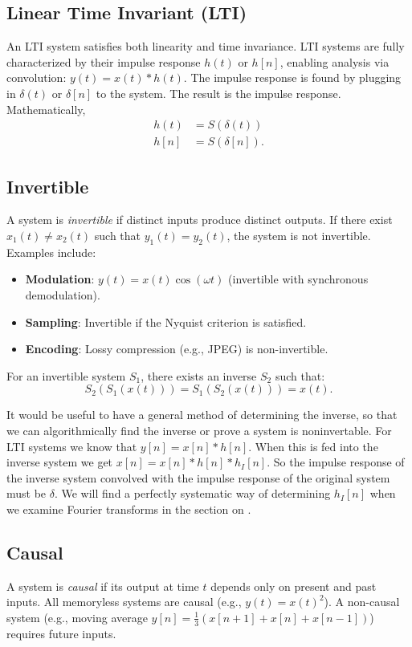 \subsection{Linear Time Invariant (LTI)}
An LTI system satisfies both linearity and time invariance.
LTI systems are fully characterized by their impulse response
\( h(t) \) or \( h[n] \), enabling analysis via convolution:
\( y(t) = x(t) * h(t) \). The impulse response is found by
plugging in $\delta(t)$ or $\delta[n]$ to the system. The result
is the impulse response. Mathematically,
\begin{align}
    h(t) & = S(\delta(t))  \\
    h[n] & = S(\delta[n]).
\end{align}


\subsection{Invertible}
A system is \emph{invertible} if distinct inputs produce distinct outputs. If there exist \( x_1(t) \neq x_2(t) \) such that \( y_1(t) = y_2(t) \), the system is not invertible. Examples include:
\begin{itemize}
    \item \textbf{Modulation}: \( y(t) = x(t)\cos(\omega t) \) (invertible with synchronous demodulation).
    \item \textbf{Sampling}: Invertible if the Nyquist criterion is satisfied.
    \item \textbf{Encoding}: Lossy compression (e.g., JPEG) is non-invertible.
\end{itemize}
For an invertible system \( S_1 \), there exists an inverse \( S_2 \) such that:
\[
    S_2(S_1(x(t))) = S_1(S_2(x(t))) = x(t).
\]

It would be useful to have a general method of determining the inverse,
so that we can algorithmically find the inverse or prove a system is
noninvertable. For LTI systems we know that $y[n] = x[n] * h[n]$. When
this is fed into the inverse system we get $x[n] = x[n] * h[n] * h_I[n]$.
So the impulse response of the inverse system convolved with the
impulse response of the original system must be $\delta$. We will find a
perfectly systematic way of determining $h_I[n]$ when we examine Fourier
transforms in the section on .


\subsection{Causal}
A system is \emph{causal} if its output at time \( t \) depends
only on present and past inputs. All memoryless systems are causal
(e.g., \( y(t) = x(t)^2 \)). A non-causal system (e.g., moving average
\( y[n] = \frac{1}{3}(x[n+1] + x[n] + x[n-1]) \)) requires future inputs.

